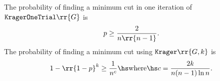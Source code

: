 \documentclass{article}
\begin{document}
\begin{theorem}
  \label{thm:krager-probabilities}
  The probability of finding a minimum cut in one iteration of $ \texttt{KragerOneTrial} \rr{ G }$
  is
  \begin{align*}
    p \geq \frac{2}{n \rr{ n-1 }}.
  \end{align*}
  The probability of finding a minimum cut using $ \texttt{Krager} \rr{ G,k }$ is
  \begin{align*}
    1-\rr{ 1-p }^k \geq \frac{1}{n^c} \hs \text{where} \hs c = \frac{2k}{n(n-1)\ln n}.
  \end{align*}
\end{theorem}
\end{document}
